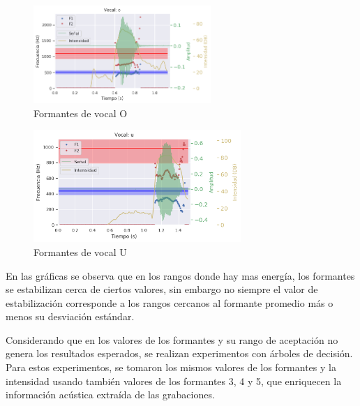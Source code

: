 \begin{figure}[H]
\caption{Formantes de vocal O}
\label{img:formantes_o}
\begin{center}
\includegraphics[width=0.6\textwidth]{imagenes/04_02_o.png}
\end{center}
\end{figure}

\begin{figure}[H]
\caption{Formantes de vocal U}
\label{img:formantes_u}
\begin{center}
\includegraphics[width=0.7\textwidth]{imagenes/04_02_u.png}
\end{center}
\end{figure}


En las gráficas se observa que en los rangos donde hay mas energía, los formantes se estabilizan cerca de ciertos valores, sin embargo no siempre el valor de estabilización corresponde a los rangos cercanos al formante promedio más o menos su desviación estándar.

Considerando que en los valores de los formantes y su rango de aceptación no genera los resultados esperados, se realizan experimentos con árboles de decisión. Para estos experimentos, se tomaron los mismos valores de los formantes y la intensidad usando también valores de los formantes 3, 4 y 5, que enriquecen la información acústica extraída de las grabaciones.

